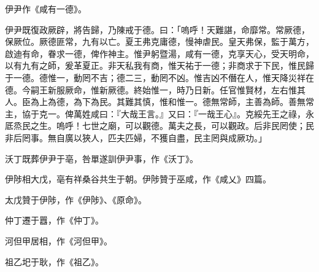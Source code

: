 
\begin{pinyinscope}
伊尹作《咸有一德》。

伊尹既復政厥辟，將告歸，乃陳戒于德。曰：「嗚呼！天難諶，命靡常。常厥德，保厥位。厥德匪常，九有以亡。夏王弗克庸德，慢神虐民。皇天弗保，監于萬方，啟迪有命，眷求一德，俾作神主。惟尹躬暨湯，咸有一德，克享天心，受天明命，以有九有之師，爰革夏正。非天私我有商，惟天祐于一德；非商求于下民，惟民歸于一德。德惟一，動罔不吉；德二三，動罔不凶。惟吉凶不僭在人，惟天降災祥在德。今嗣王新服厥命，惟新厥德。終始惟一，時乃日新。任官惟賢材，左右惟其人。臣為上為德，為下為民。其難其慎，惟和惟一。德無常師，主善為師。善無常主，協于克一。俾萬姓咸曰：『大哉王言。』又曰：『一哉王心』。克綏先王之祿，永厎烝民之生。嗚呼！七世之廟，可以觀德。萬夫之長，可以觀政。后非民罔使；民非后罔事。無自廣以狹人，匹夫匹婦，不獲自盡，民主罔與成厥功。」

沃丁既葬伊尹于亳，咎單遂訓伊尹事，作《沃丁》。

伊陟相大戊，亳有祥桑谷共生于朝。伊陟贊于巫咸，作《咸乂》四篇。

太戊贊于伊陟，作《伊陟》、《原命》。

仲丁遷于囂，作《仲丁》。

河但甲居相，作《河但甲》。

祖乙圯于耿，作《祖乙》。


\end{pinyinscope}